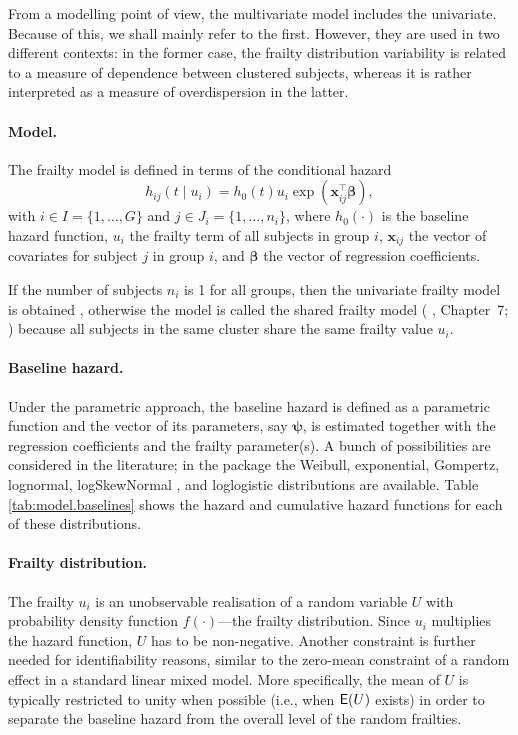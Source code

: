 From a modelling point of view, the multivariate model includes the univariate.
Because of this, we shall mainly refer to the first.
However, they are used in two different contexts: 
	in the former case, the frailty distribution variability is related to a measure of dependence between clustered subjects,
	whereas it is rather interpreted as a measure of overdispersion in the latter.

\paragraph{Model.}
The frailty model is defined in terms of the conditional hazard 
\begin{equation*}
  h_{ij}(t \mid u_i) = h_0(t) u_i \exp{(\bm{x}_{ij}^\top \bm\beta)},
\end{equation*}
with  $i \in I = \{ 1, \ldots, G \}$ and $j \in J_{i} = \{ 1, \ldots, n_i \}$, where
      $h_0( \cdot )$ is the baseline hazard function,
      $u_i$ the frailty term of all subjects in group $i$,
      $\bm{x}_{ij}$ the vector of covariates for subject $j$ in group $i$, and
      $\bm\beta$ the vector of regression coefficients.

If the number of subjects $n_i$ is 1 for all groups, then the univariate frailty model is obtained
  \cite[Chapter~3]{Wienke10},
otherwise the model is called the {shared} frailty model (\citeauthor{Hougaard00} \citeyear{Hougaard00}, Chapter~7; \citeauthor{DuchateauJanssen08} \citeyear{DuchateauJanssen08})
  because all subjects in the same cluster share the same frailty value $u_i$.


\paragraph{Baseline hazard.}
Under the parametric approach, the baseline hazard is defined as a parametric
  function and the vector of its parameters, say $\bm{\psi}$,
  is estimated together with the regression coefficients and the frailty parameter(s).
A bunch of possibilities are considered in the literature;
in the  package the
  Weibull,
  exponential,
  Gompertz,
  lognormal, 
  logSkewNormal \citep{Azzalini85}, and
  loglogistic
  distributions are available.
Table \ref{tab:model.baselines} shows the hazard and cumulative hazard functions for each of these distributions.

  


\paragraph{Frailty distribution.}
The frailty $u_i$ is an unobservable realisation of a random variable $U$
  with probability density function $f(\cdot)$---the frailty distribution.
Since $u_i$ multiplies the hazard function, $U$ has to be non-negative.
Another constraint is further needed for identifiability reasons,
  similar to the zero-mean constraint of a random effect in a standard linear mixed model.
More specifically, the mean of $U$ is typically restricted to unity when possible (i.e., when $\mathsf{E}(U)$ exists)
in order to separate the baseline hazard from the overall level of the random frailties.


